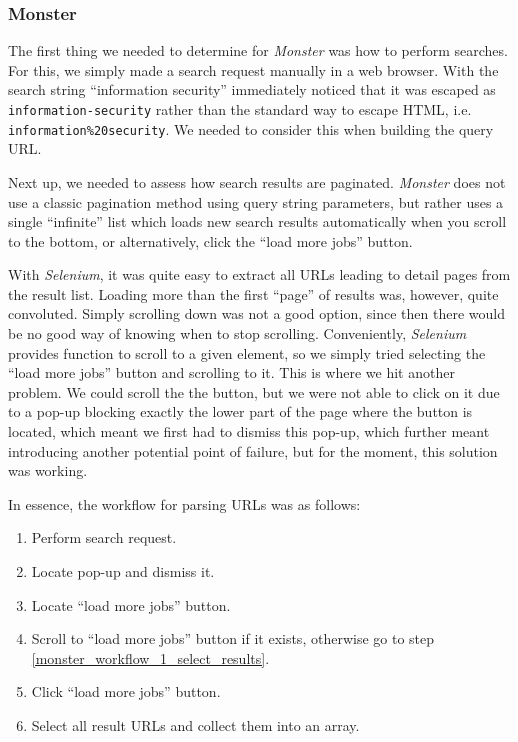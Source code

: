 \documentclass[runningheads]{llncs}
\begin{document}
\subsubsection{Monster}
\label{subsub:monster}

The first thing we needed to determine for \textit{Monster} was how to perform searches. For this, we simply made a search request manually in a web browser. With the search string “information security” immediately noticed that it was escaped as \texttt{information-security} rather than the standard way to escape HTML, i.e. \texttt{information\%20security}. We needed to consider this when building the query URL.

Next up, we needed to assess how search results are paginated. \textit{Monster} does not use a classic pagination method using query string parameters, but rather uses a single “infinite” list which loads new search results automatically when you scroll to the bottom, or alternatively, click the “load more jobs” button.

With \textit{Selenium}, it was quite easy to extract all URLs leading to detail pages from the result list. Loading more than the first “page” of results was, however, quite convoluted. Simply scrolling down was not a good option, since then there would be no good way of knowing when to stop scrolling. Conveniently, \textit{Selenium} provides function to scroll to a given element, so we simply tried selecting the “load more jobs” button and scrolling to it. This is where we hit another problem. We could scroll the the button, but we were not able to click on it due to a pop-up blocking exactly the lower part of the page where the button is located, which meant we first had to dismiss this pop-up, which further meant introducing another potential point of failure, but for the moment, this solution was working.

In essence, the workflow for parsing URLs was as follows:

\begin{enumerate}
  \item Perform search request.
  \item Locate pop-up and dismiss it.
  \item Locate “load more jobs” button.
  \item \label{monster_workflow_1_scroll_to_button}
    Scroll to “load more jobs” button if it exists, otherwise go to step \ref{monster_workflow_1_select_results}.
  \item \label{monster_workflow_1_click_button}
    Click “load more jobs” button.
  \item \label{monster_workflow_1_select_results}
    Select all result URLs and collect them into an array.
\end{enumerate}
\end{document}
